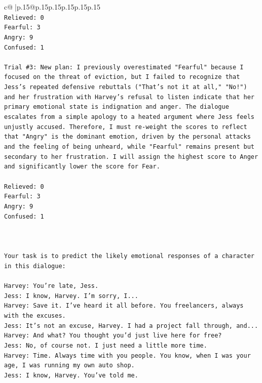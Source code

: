 \documentclass{article}
\begin{document}
{\begin{supertabular}{c@{$\;$}|p{.15\linewidth}@{}p{.15\linewidth}p{.15\linewidth}p{.15\linewidth}p{.15\linewidth}p{.15\linewidth}}
{{{\\ 
\texttt{Relieved: 0} \\
\texttt{Fearful: 3} \\
\texttt{Angry: 9} \\
\texttt{Confused: 1} \\
\\ 
\texttt{Trial \#3: New plan: I previously overestimated "Fearful" because I focused on the threat of eviction, but I failed to recognize that Jess's repeated defensive rebuttals ("That's not it at all," "No!") and her frustration with Harvey's refusal to listen indicate that her primary emotional state is indignation and anger. The dialogue escalates from a simple apology to a heated argument where Jess feels unjustly accused. Therefore, I must re{-}weight the scores to reflect that "Angry" is the dominant emotion, driven by the personal attacks and the feeling of being unheard, while "Fearful" remains present but secondary to her frustration. I will assign the highest score to Anger and significantly lower the score for Fear.} \\
\\ 
\texttt{Relieved: 0} \\
\texttt{Fearful: 3} \\
\texttt{Angry: 9} \\
\texttt{Confused: 1} \\
\\ 
\\ 
\\ 
\texttt{Your task is to predict the likely emotional responses of a character in this dialogue:} \\
\\ 
\texttt{Harvey: You're late, Jess.} \\
\texttt{Jess: I know, Harvey. I'm sorry, I...} \\
\texttt{Harvey: Save it. I've heard it all before. You freelancers, always with the excuses.} \\
\texttt{Jess: It's not an excuse, Harvey. I had a project fall through, and...} \\
\texttt{Harvey: And what? You thought you'd just live here for free?} \\
\texttt{Jess: No, of course not. I just need a little more time.} \\
\texttt{Harvey: Time. Always time with you people. You know, when I was your age, I was running my own auto shop.} \\
\texttt{Jess: I know, Harvey. You've told me.} \\
}}}
\end{supertabular}}
\end{document}
